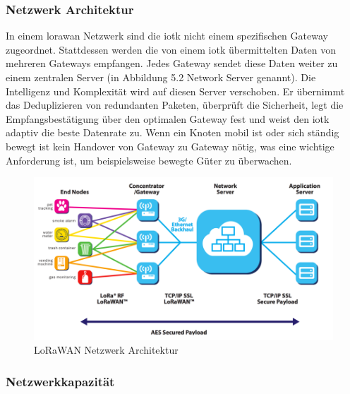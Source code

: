 \subsubsection*{Netzwerk Architektur}

In einem \gls{lorawan} Netzwerk sind die \gls{iotk} nicht einem spezifischen Gateway zugeordnet. Stattdessen werden die von einem \gls{iotk} übermittelten Daten von mehreren Gateways empfangen. Jedes Gateway sendet diese Daten weiter zu einem zentralen Server (in Abbildung 5.2 Network Server genannt). Die Intelligenz und Komplexität wird auf diesen Server verschoben. Er übernimmt das Deduplizieren von redundanten Paketen, überprüft die Sicherheit, legt die Empfangsbestätigung über den optimalen Gateway fest und weist den \gls{iotk} adaptiv die beste Datenrate zu. Wenn ein Knoten mobil ist oder sich ständig bewegt ist kein Handover von Gateway zu Gateway nötig, was eine wichtige Anforderung ist, um beispielsweise bewegte Güter zu überwachen.

\begin{figure}[H]
     \centering
        \includegraphics[width=1.0\textwidth]{pictures/lorawan-network-architecture.png}
    \caption{LoRaWAN Netzwerk Architektur}
    \label{fig:LoRaWAN Netzwerk Architektur}
\end{figure}

\subsubsection*{Netzwerkkapazität}

